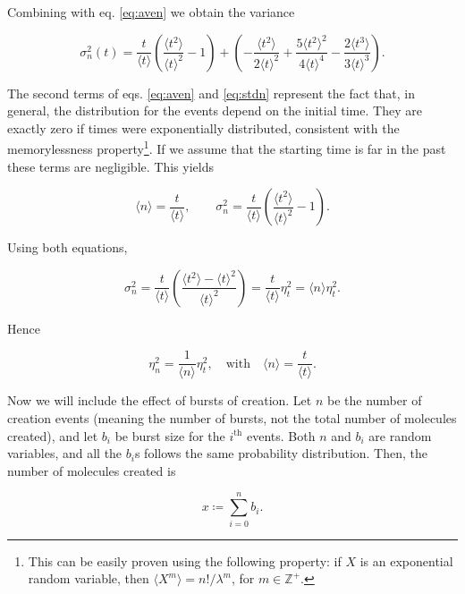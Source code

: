 Combining with eq. \eqref{eq:aven} we obtain the variance

\begin{equation}
  \label{eq:stdn}
  \sigma_n^2(t) = \frac{t}{\langle t\rangle}\left(\frac{\langle t^2\rangle}{\langle t\rangle^2}-1\right)+\left(-\frac{\langle t^2\rangle}{2\langle t\rangle^2} + \frac{5\langle t^2\rangle^2}{4\langle t\rangle^4}-\frac{2\langle t^3\rangle}{3\langle t\rangle^3}\right).
\end{equation}

The second terms of eqs. \eqref{eq:aven} and \eqref{eq:stdn} represent the fact that, in general, the distribution for the events depend on the initial time. They are exactly zero if times were exponentially distributed, consistent with the memorylessness property\footnote{This can be easily proven using the following property: if $X$ is an exponential random variable, then $\langle X^m\rangle = n!/\lambda^m$, for $m\in\mathbb{Z}^+$.}. If we assume that the starting time is far in the past these terms are negligible. This yields

\begin{equation*}
  \langle n\rangle = \frac{t}{\langle t\rangle},\quad\quad\sigma_n^2 = \frac{t}{\langle t\rangle}\left(\frac{\langle t^2\rangle}{\langle t\rangle^2}-1\right).
\end{equation*}

Using both equations,

\begin{equation*}
  \sigma_n^2 = \frac{t}{\langle t\rangle}\left(\frac{\langle t^2\rangle - \langle t\rangle^2}{\langle t\rangle^2}\right) = \frac{t}{\langle t\rangle}\eta_t^2 = \langle n\rangle\eta_t^2.
\end{equation*}

Hence

\begin{equation}
  \label{eq:noisen1}
  \eta_n^2=\frac{1}{\langle n\rangle}\eta_t^2, \quad \text{with}\quad \langle n\rangle = \frac{t}{\langle t\rangle}.
\end{equation}

Now we will include the effect of bursts of creation. Let $n$ be the number of creation events (meaning the number of bursts, not the total number of molecules created), and let $b_i$ be burst size for the $i^{\text{th}}$ events. Both $n$ and $b_i$ are random variables, and all the $b_i$s follows the same probability distribution. Then, the number of molecules created is

\begin{equation}
  \label{eq:xtotal}
  x\coloneqq\sum_{i=0}^nb_i.
\end{equation}

